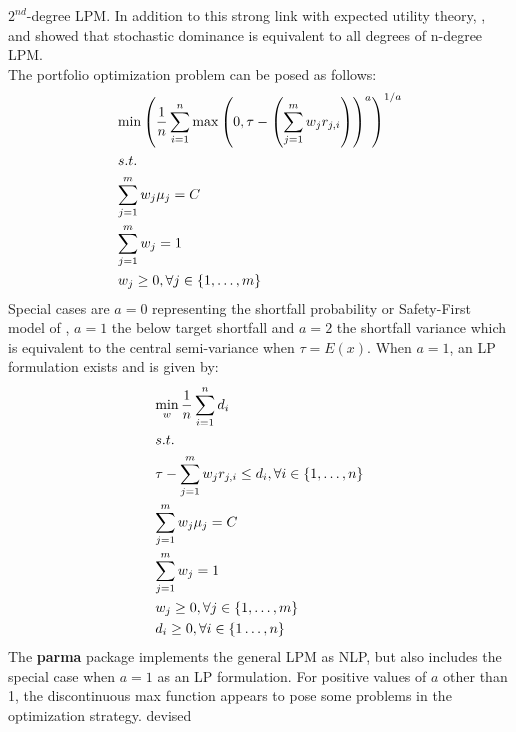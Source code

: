 $2^{nd}$-degree LPM. In addition to this strong link with expected utility
theory, ,  and
 showed that stochastic dominance is equivalent to
all degrees
of n-degree LPM.\\
The portfolio optimization problem can be posed as follows:
\begin{equation}
\begin{gathered}
 {\min {{\left( {\frac{1}{n}\sum\limits_{i=1}^n {\max {{\left( {0,\tau  - \left( {\sum\limits_{j=1}^m {{w_j}{r_{j,i}}} } \right)} \right)}^a}} } \right)}^{1/a}}}  \hfill \\
  s.t. \hfill\\
  \sum\limits_{j=1}^m {{w_j}{\mu _j}=C}  \hfill \\
  \sum\limits_{j=1}^m {{w_j}=1}  \hfill \\
  {w_j} \geq 0,\forall j \in \left\{ {1,\dots,m} \right\} \hfill \\
\end{gathered}
\end{equation}
Special cases are $a=0$ representing the shortfall probability or
Safety-First  model of , $a=1$ the below target shortfall
and $a=2$ the shortfall variance which is equivalent to the central
semi-variance when $\tau=E\left(x\right)$. When $a=1$, an LP formulation
exists and is given by:
\begin{equation}
\begin{gathered}
  \mathop {\min }\limits_w \frac{1}{n}\sum\limits_{i=1}^n {{d_i}}  \hfill \\
  s.t. \hfill \\
  \tau  - \sum\limits_{j=1}^m {{w_j}{r_{j,i}}}  \leq {d_i},\forall i \in \left\{ {1,\dots,n} \right\} \hfill \\
  \sum\limits_{j=1}^m {{w_j}{\mu _j}=C}  \hfill \\
  \sum\limits_{j=1}^m {{w_j}=1}  \hfill \\
  {w_j} \geq 0,\forall j \in \left\{ {1,\dots,m} \right\} \hfill \\
  {d_i} \geq 0,\forall i \in \left\{ {1\dots,n} \right\} \hfill \\
\end{gathered}
\end{equation}
The \textbf{parma} package implements the general LPM as NLP, but also
includes  the  special case when $a=1$ as an LP formulation. For positive
values of $a$ other than 1, the discontinuous max function appears to pose
some problems in the optimization strategy.  devised
